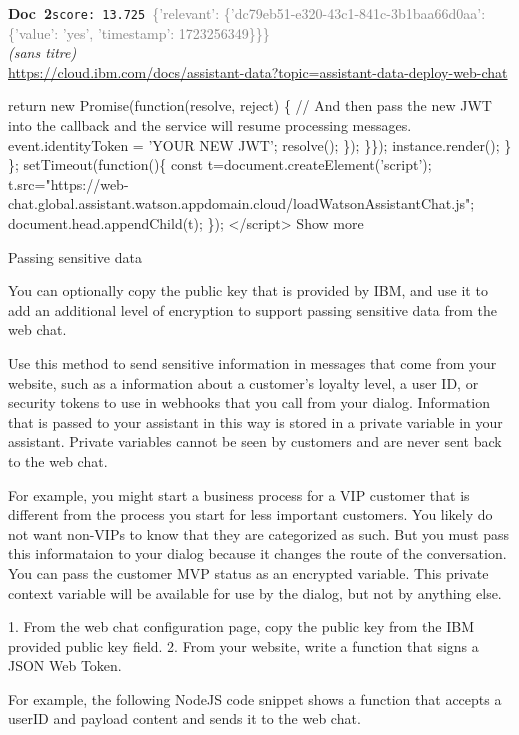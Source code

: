 \documentclass[a4paper,11pt]{article}
\begin{document}
\begin{docenv}
{\footnotesize\textcolor{doccolor}{\textbf{Doc~2}}}\hfill{\tiny\texttt{score:~13.725}}\ {\tiny\textcolor{gray}{\{'relevant': \{'dc79eb51-e320-43c1-841c-3b1baa66d0aa': \{'value': 'yes', 'timestamp': 1723256349\}\}\}}}\\[3pt]
{\small\textit{(sans titre)}}\\[2pt]
{\tiny\url{https://cloud.ibm.com/docs/assistant-data?topic=assistant-data-deploy-web-chat}}\\[4pt]
{\footnotesize 
return new Promise(function(resolve, reject) \{
// And then pass the new JWT into the callback and the service will resume processing messages.
event.identityToken = 'YOUR NEW JWT';
resolve();
\});
\}\});
instance.render();
\}
\};
setTimeout(function()\{
const t=document.createElement('script');
t.src="https://web-chat.global.assistant.watson.appdomain.cloud/loadWatsonAssistantChat.js";
document.head.appendChild(t);
\});
</script>
Show more







 Passing sensitive data 

You can optionally copy the public key that is provided by IBM, and use it to add an additional level of encryption to support passing sensitive data from the web chat.

Use this method to send sensitive information in messages that come from your website, such as a information about a customer's loyalty level, a user ID, or security tokens to use in webhooks that you call from your dialog. Information that is passed to your assistant in this way is stored in a private variable in your assistant. Private variables cannot be seen by customers and are never sent back to the web chat.

For example, you might start a business process for a VIP customer that is different from the process you start for less important customers. You likely do not want non-VIPs to know that they are categorized as such. But you must pass this informataion to your dialog because it changes the route of the conversation. You can pass the customer MVP status as an encrypted variable. This private context variable will be available for use by the dialog, but not by anything else.



1. From the web chat configuration page, copy the public key from the IBM provided public key field.
2. From your website, write a function that signs a JSON Web Token.

For example, the following NodeJS code snippet shows a function that accepts a userID and payload content and sends it to the web chat.}
\end{docenv}
\end{document}
